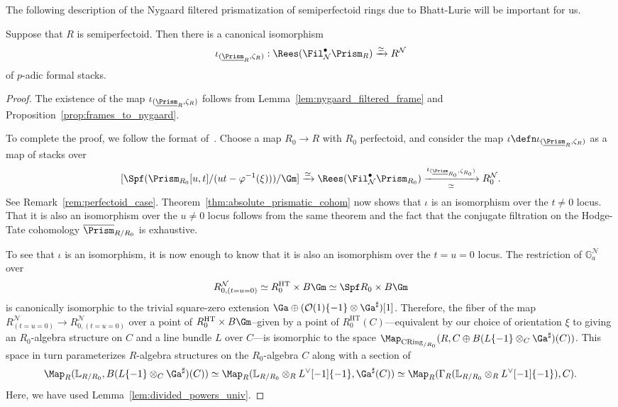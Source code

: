 \documentclass[10pt]{amsart}
\begin{document}
The following description of the Nygaard filtered prismatization of semiperfectoid rings due to Bhatt-Lurie will be important for us.
\begin{theorem}
\label{thm:semiperf_crys}
Suppose that $R$ is semiperfectoid. Then there is a canonical isomorphism
\[
\iota_{(\underline{\Prism}_R,\zeta_R)}:\Rees(\Fil^\bullet_{\mathcal{N}}\Prism_R)\xrightarrow{\simeq} R^{\mathcal{N}}
\]
of $p$-adic formal stacks.
\end{theorem}
\begin{proof}
The existence of the map $\iota_{(\underline{\Prism}_R,\zeta_R)}$ follows from Lemma~\ref{lem:nygaard_filtered_frame} and Proposition~\ref{prop:frames_to_nygaard}. 

To complete the proof, we follow the format of~\cite[Theorem 5.5.10]{bhatt_lectures}. Choose a map $R_0\to R$ with $R_0$ perfectoid, and consider the map $\iota \defn \iota_{(\underline{\Prism}_R,\zeta_R)}$ as a map of stacks over 
\[
[\Spf(\Prism_{R_0}[u,t]/(ut-\varphi^{-1}(\xi)))/\Gm]\xrightarrow{\simeq}\Rees(\Fil^\bullet_{\mathcal{N}}\Prism_{R_0})\xrightarrow[\simeq]{\iota_{(\underline{\Prism}_{R_0},\zeta_{R_0})}}R_0^{\mathcal{N}}.
\]
See Remark~\ref{rem:perfectoid_case}. Theorem~\ref{thm:absolute_prismatic_cohom} now shows that $\iota$ is an isomorphism over the $t\neq 0$ locus. That it is also an isomorphism over the $u\neq 0$ locus follows from the same theorem and the fact that the conjugate filtration on the Hodge-Tate cohomology $\overline{\Prism}_{R/R_0}$ is exhaustive. 


To see that $\iota$ is an isomorphism, it is now enough to know that it is also an isomorphism over the $t=u=0$ locus. The restriction of $\mathbb{G}^{\mathcal{N}}_{a}$ over 
\[
R^{\mathcal{N}}_{0,(t=u=0)}\simeq R_0^{\mathrm{HT}}\times B\Gm\simeq  \Spf R_0\times B\Gm
\]
 is canonically isomorphic to the trivial square-zero extension $\Ga\oplus (\mathcal{O}(1)\{-1\}\otimes\Ga^\sharp)[1]$. Therefore, the fiber of the map $R^{\mathcal{N}}_{(t=u=0)}\to R^{\mathcal{N}}_{0,(t=u=0)}$ over a point of $R_0^{\mathrm{HT}}\times B\Gm$--given by a point of $R_0^{\mathrm{HT}}(C)$---equivalent by our choice of orientation $\xi$ to giving an $R_0$-algebra structure on $C$ and a line bundle $L$ over $C$---is isomorphic to the space $\Map_{\mathrm{CRing}_{/R_0}}(R,C\oplus B(L\{-1\}\otimes_C\Ga^\sharp)(C))$. This space in turn parameterizes $R$-algebra structures on the $R_0$-algebra $C$ along with a section of
\[
\Map_{R}(\mathbb{L}_{R/R_0},B(L\{-1\}\otimes_C\Ga^\sharp)(C))\simeq\Map_R(\mathbb{L}_{R/R_0}\otimes_RL^\vee[-1]\{-1\},\Ga^\sharp(C))\simeq \Map_R(\Gamma_R(\mathbb{L}_{R/R_0}\otimes_RL^\vee[-1]\{-1\}),C).
\]
Here, we have used Lemma~\ref{lem:divided_powers_univ}. 


\end{proof}
\end{document}

